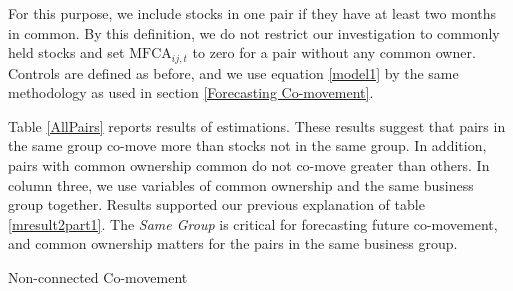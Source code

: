 	For this purpose, we include stocks in one pair if they have at least two months in common. By this definition, we do not restrict our investigation to commonly held stocks and set $\text{MFCA}_{ij,t}$ to zero for a pair without any common owner. Controls are defined as before, and we use equation \ref{model1} by the same methodology as used in section \ref{Forecasting Co-movement}.
	
	Table \ref{AllPairs} reports results of estimations. These results suggest that pairs in the same group co-move more than stocks not in the same group. In addition, pairs with common ownership common do not co-move greater than others. In column three, we use variables of common ownership and the same business group together. Results supported our previous explanation of table \ref{mresult2part1}. The \textit{Same Group} is critical for forecasting future co-movement, and common ownership matters for the pairs in the same business group.
					
					{\begin{table}[htbp]
							
							\caption{Non-connected Co-movement}
							\label{AllPairs}
							\resizebox{1\textwidth}{!}{
								
									{	
									}
							}
					\end{table}}
					
				
					
					
%					
					
					
					\FloatBarrier
